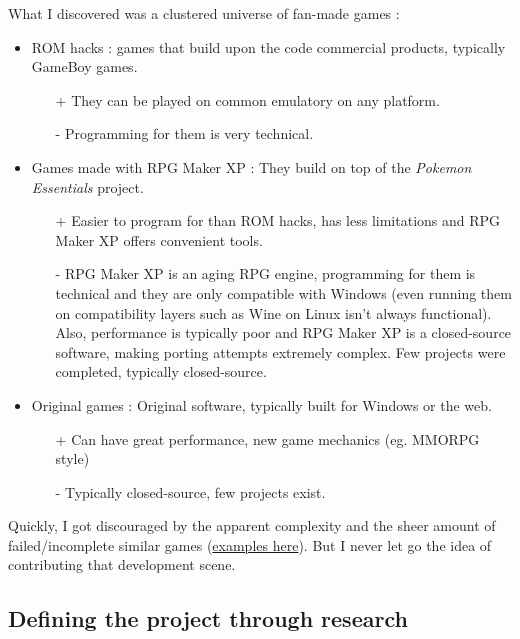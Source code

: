 \documentclass[11pt]{article}
\begin{document}
What I discovered was a clustered universe of fan-made games :
\begin{itemize}
	\item ROM hacks : games that build upon the code commercial products, typically GameBoy games.
	\begin{itemize}
		\item[+] They can be played on common emulatory on any platform.
		\item[-] Programming for them is very technical.
	\end{itemize}
	
	\item Games made with RPG Maker XP : They build on top of the \textit{Pokemon Essentials} project.
	
	\begin{itemize}
		\item[+] Easier to program for than ROM hacks, has less limitations and RPG Maker XP offers convenient tools.
		\item[-] RPG Maker XP is an aging RPG engine, programming for them is technical and they are only compatible with Windows (even running them on compatibility layers such as Wine on Linux isn't always functional). Also, performance is typically poor and RPG Maker XP is a closed-source software, making porting attempts extremely complex. Few projects were completed, typically closed-source.
	\end{itemize}

	\item Original games : Original software, typically built for Windows or the web.
	\begin{itemize}
		\item[+] Can have great performance, new game mechanics (eg. MMORPG style)
		\item[-] Typically closed-source, few projects exist.
	\end{itemize}
\end{itemize}

Quickly, I got discouraged by the apparent complexity and the sheer amount of failed/incomplete similar games (\href{https://pokemon-fan-game.fandom.com/wiki/Category:Incomplete_Games}{examples here}). But I never let go the idea of contributing that development scene.


\subsection{Defining the project through research}
\end{document}
